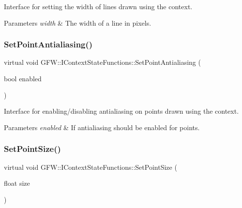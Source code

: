 Interface for setting the width of lines drawn using the context. 


\begin{DoxyParams}{Parameters}
{\em width} & The width of a line in pixels. \\
\hline
\end{DoxyParams}
\mbox{\label{class_g_f_w_1_1_i_context_state_functions_aeac582c0988c75d86d980d61b669e498}} 
\subsubsection{\texorpdfstring{Set\+Point\+Antialiasing()}{SetPointAntialiasing()}}
{\footnotesize\ttfamily virtual void G\+F\+W\+::\+I\+Context\+State\+Functions\+::\+Set\+Point\+Antialiasing (\begin{DoxyParamCaption}\item[{bool}]{enabled }\end{DoxyParamCaption})\hspace{0.3cm}{\ttfamily [pure virtual]}}



Interface for enabling/disabling antialiasing on points drawn using the context. 


\begin{DoxyParams}{Parameters}
{\em enabled} & If antialiasing should be enabled for points. \\
\hline
\end{DoxyParams}
\mbox{\label{class_g_f_w_1_1_i_context_state_functions_a768ba46c0b8f967f108fee6e5b806ee6}} 
\subsubsection{\texorpdfstring{Set\+Point\+Size()}{SetPointSize()}}
{\footnotesize\ttfamily virtual void G\+F\+W\+::\+I\+Context\+State\+Functions\+::\+Set\+Point\+Size (\begin{DoxyParamCaption}\item[{float}]{size }\end{DoxyParamCaption})\hspace{0.3cm}{\ttfamily [pure virtual]}}



